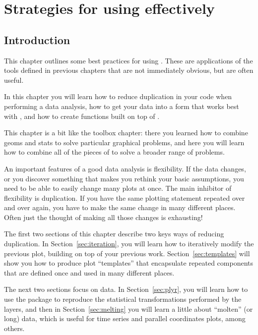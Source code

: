 

% 


\chapter{Strategies for using \ggplot effectively}
\label{cha:strategy}

\section{Introduction}

This chapter outlines some best practices for using \ggplot.  These are applications of the tools defined in previous chapters that are not immediately obvious, but are often useful.  

In this chapter you will learn how to reduce duplication in your code when performing a data analysis, how to get your data into a form that works best with \ggplot, and how to create functions built on top of \ggplot.

This chapter is a bit like the toolbox chapter: there you learned how to combine geoms and stats to solve particular graphical problems, and here you will learn how to combine all of the pieces of \ggplot to solve a broader range of problems.

An important features of a good data analysis is flexibility. If the data changes, or you discover something that makes you rethink your basic assumptions, you need to be able to easily change many plots at once. The main inhibitor of flexibility is duplication. If you have the same plotting statement repeated over and over again, you have to make the same change in many different places. Often just the thought of making all those changes is exhausting!

The first two sections of this chapter describe two keys ways of reducing duplication.  In Section~\ref{sec:iteration}, you will learn how to iteratively modify the previous plot, building on top of your previous work.  Section~\ref{sec:templates} will show you how to produce plot ``templates'' that encapsulate repeated components that are defined once and used in many different places.

The next two sections focus on data.  In Section~\ref{sec:plyr}, you will learn how to use the  package to reproduce the statistical transformations performed by the layers, and then in Section~\ref{sec:melting} you will learn a little about ``molten'' (or long) data, which is useful for time series and parallel coordinates plots, among others.  

